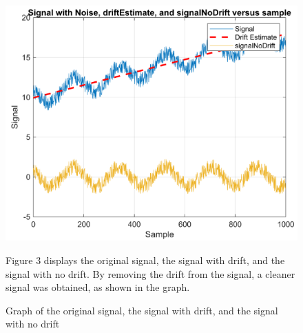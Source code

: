 \documentclass[journal]{IEEEtran}
\begin{document}
\begin{figure}[H] %
    \centering
    \includegraphics[width=\linewidth]{3.2 plot.png}
    \caption{Graph of the original signal, the signal with drift, and the signal with no drift}
    \vspace{1em} %
    \begin{minipage}{\linewidth}
        \small
        Figure 3 displays the original signal, the signal with drift, and the signal with no drift. By removing the drift from the signal, a cleaner signal was obtained, as shown in the graph.
    \end{minipage}
    \label{Part 3: No Drift Graph}
\end{figure}
\end{document}
